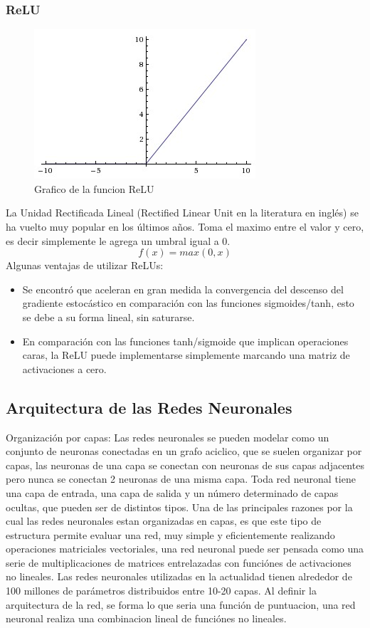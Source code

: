 \documentclass[a4paper,11pt,spanish]{book}
\begin{document}
	  \subsubsection {ReLU}
	    \begin{figure}[h]
	      \includegraphics[scale=0.5]{./img/relu.jpeg}
	      \caption{Grafico de la funcion ReLU}
	      \label{fig:relu}
	    \end{figure}
	    La Unidad Rectificada Lineal (Rectified Linear Unit en la literatura en inglés) se ha vuelto muy popular en los últimos años. Toma el maximo entre el valor y cero, es decir 
	    simplemente le agrega un umbral igual a 0.
	    \begin{equation}
	     f(x) = max(0,x)
	    \end{equation}
	    Algunas ventajas de utilizar ReLUs:
	    \begin{itemize}
	      \item Se encontró que aceleran en gran medida la convergencia del descenso del gradiente estocástico en comparación con las funciones sigmoides/tanh, esto se debe a su forma lineal, sin saturarse.
	      \item En comparación con las funciones tanh/sigmoide que implican operaciones caras, la ReLU puede implementarse simplemente marcando una matriz de activaciones a cero.
	    \end{itemize}

	    
    \subsection {Arquitectura de las Redes Neuronales}
      Organización por capas: Las redes neuronales se pueden modelar como un conjunto de neuronas conectadas en un grafo aciclico, que se suelen organizar por capas, las neuronas de una capa
      se conectan con neuronas de sus capas adjacentes pero nunca se conectan 2 neuronas de una misma capa.
      Toda red neuronal tiene una capa de entrada, una capa de salida y un número determinado de capas ocultas, que pueden ser de distintos tipos.
      Una de las principales razones por la cual las redes neuronales estan organizadas en capas, es que este tipo de estructura permite evaluar una red, muy simple y eficientemente realizando
      operaciones matriciales vectoriales, una red neuronal puede ser pensada como una serie de multiplicaciones de matrices entrelazadas con funciónes de activaciones no lineales.
      Las redes neuronales utilizadas en la actualidad tienen alrededor de 100 millones de parámetros distribuidos entre 10-20 capas.
      Al definir la arquitectura de la red, se forma lo que seria una función de puntuacion, una red neuronal realiza una combinacion lineal de funciónes no lineales. 
\end{document}
